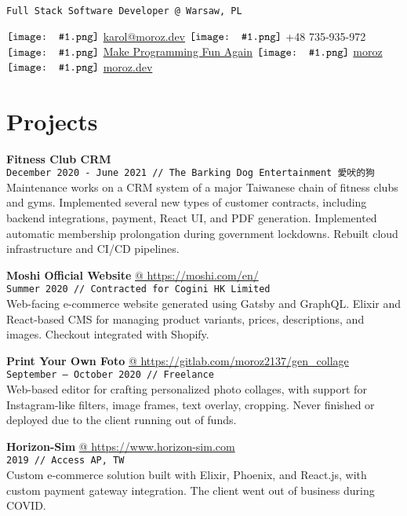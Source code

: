 \documentclass[10pt,a4paper]{article}
\author{Karol Moroz}
\makeatletter
\newcommand{\icon}[1]{$\vcenter{\hbox{\texttt{[image: \#1.png]}}}$\hspace{.2em}}
\newcommand{\project}[3]{\par\vspace{1em}\textbf{\normalsize #1}\\{\footnotesize\texttt{#2 // #3}}\\[4pt]}
\newcommand{\projectweb}[4]{\par\vspace{1em}\textbf{\normalsize #1} \href{#2}{\color{darkgray} @ #2}\\{\footnotesize\texttt{#3 // #4}}\\[4pt]}
\makeatother
\begin{document}
\pagestyle{empty}

\texttt{Full Stack Software Developer @ Warsaw, PL}

\icon{email}
\href{mailto:karol@moroz.dev}{karol@moroz.dev} \hfill
\icon{telephone} +48 735-935-972 \hfill
\icon{youtube} \href{https://www.youtube.com/channel/UCW_YiVuoo-WG0bxQElVgxAg}{Make Programming Fun Again} \hfill
\icon{github} \href{https://github.com/moroz}{moroz} \hfill
\icon{web} \href{https://moroz.dev}{moroz.dev}

\begin{minipage}[t]{0.67\textwidth}
  \raggedright
  \section{Projects}
  \vspace*{-6pt}

  \project{Fitness Club CRM}{December 2020 {-} June 2021}{The Barking Dog Entertainment 愛吠的狗}

  \small
  Maintenance works on a CRM system of a major Taiwanese chain of fitness clubs and gyms.
  Implemented several new types of customer contracts, including backend integrations, payment, React UI,
  and PDF generation. Implemented automatic membership prolongation during government lockdowns.
  Rebuilt cloud infrastructure and CI/CD pipelines.

  \projectweb{Moshi Official Website}{https://moshi.com/en/}{Summer 2020}{Contracted for Cogini HK Limited}

  \small
  Web-facing e-commerce website generated using Gatsby and GraphQL. Elixir and React-based CMS for managing product variants, prices, descriptions, and images.
  Checkout integrated with Shopify.

  \projectweb{Print Your Own Foto}{https://gitlab.com/moroz2137/gen\_collage}{September {–} October 2020}{Freelance}

  \small
  Web-based editor for crafting personalized photo collages, with support for Instagram-like filters, image frames, text overlay, cropping.
  Never finished or deployed due to the client running out of funds.

  \projectweb{Horizon-Sim}{https://www.horizon-sim.com}{2019}{Access AP, TW}

  \small
  Custom e-commerce solution built with Elixir, Phoenix, and React.js, with custom payment gateway integration.
  The client went out of business during COVID.


\end{minipage}
\end{document}
